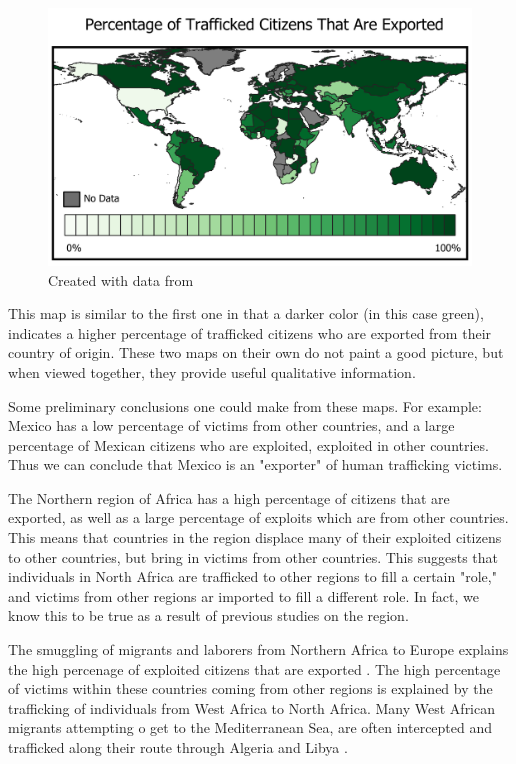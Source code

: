 \documentclass{article} %
\begin{document}
\begin{center}
	\begin{figure}[H]
		\includegraphics[width = 5.6in]{ProposalMap2}
		\scriptsize{\caption{Created with data from \cite{CTDC}}}
	\end{figure}
\end{center}
\FloatBarrier

This map is similar to the first one in that a darker color (in this case green), indicates a higher percentage of trafficked citizens who are exported from their country of origin. These two maps on their own do not paint a good picture, but when viewed together, they provide useful qualitative information.

Some preliminary conclusions one could make from these maps. For example: Mexico has a low percentage of victims from other countries, and a large percentage of Mexican citizens who are exploited, exploited in other countries. Thus we can conclude that Mexico is an "exporter" of human trafficking victims.
	
The Northern region of Africa has a high percentage of citizens that are exported, as well as a large percentage of exploits which are from other countries. This means that countries in the region displace many of their exploited citizens to other countries, but bring in victims from other countries. This suggests that individuals in North Africa are trafficked to other regions to fill a certain "role," and victims from other regions ar imported to fill a different role. In fact, we know this to be true as a result of previous studies on the region.

The smuggling of migrants and laborers from Northern Africa to Europe explains the high percenage of exploited citizens that are exported \parencite{AfricaExport}. The high percentage of victims within these countries coming from other regions is explained by the trafficking of individuals from West Africa to North Africa. Many West African migrants attempting o get to the Mediterranean Sea, are often intercepted and trafficked along their route through Algeria and Libya \parencite{AfricaImport}.
\end{document}
